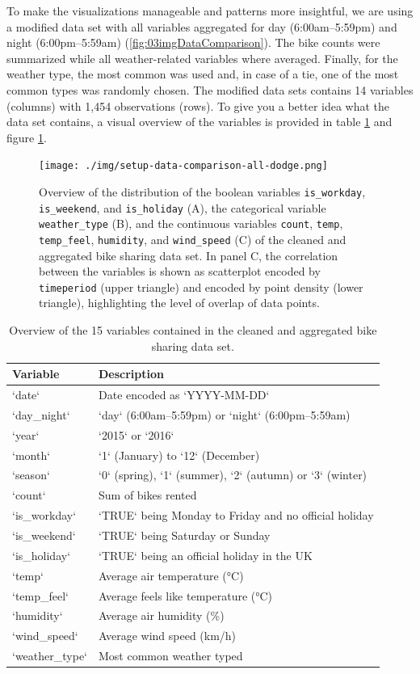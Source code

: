 \documentclass[
]{krantz}
\begin{document}
To make the visualizations manageable and patterns more insightful, we are using a modified data set with all variables aggregated for day (6:00am--5:59pm) and night (6:00pm--5:59am) (\ref{fig:03imgDataComparison}). The bike counts were summarized while all weather-related variables where averaged. Finally, for the weather type, the most common was used and, in case of a tie, one of the most common types was randomly chosen. The modified data sets contains 14 variables (columns) with 1,454 observations (rows). To give you a better idea what the data set contains, a visual overview of the variables is provided in table \ref{tab:03tableBikesData} and figure \ref{fig:03imgDataOverviewVars}.

\begin{figure}
\centering
\texttt{[image: ./img/setup-data-comparison-all-dodge.png]}
\caption{\label{fig:03imgDataOverviewVars}Overview of the distribution of the boolean variables \texttt{is\_workday}, \texttt{is\_weekend}, and \texttt{is\_holiday} (A), the categorical variable \texttt{weather\_type} (B), and the continuous variables \texttt{count}, \texttt{temp}, \texttt{temp\_feel}, \texttt{humidity}, and \texttt{wind\_speed} (C) of the cleaned and aggregated bike sharing data set. In panel C, the correlation between the variables is shown as scatterplot encoded by \texttt{timeperiod} (upper triangle) and encoded by point density (lower triangle), highlighting the level of overlap of data points.}
\end{figure}

\begin{longtable}[t]{ll}
\caption{\label{tab:03tableBikesData}Overview of the 15 variables contained in the cleaned and aggregated bike sharing data set.}\\
\toprule
Variable & Description\\
\midrule
`date` & Date encoded as `YYYY-MM-DD`\\
`day\_night` & `day` (6:00am–5:59pm) or `night` (6:00pm–5:59am)\\
`year` & `2015` or `2016`\\
`month` & `1` (January) to `12` (December)\\
`season` & `0` (spring), `1` (summer), `2` (autumn) or `3` (winter)\\
\addlinespace
`count` & Sum of bikes rented\\
`is\_workday` & `TRUE` being Monday to Friday and no official holiday\\
`is\_weekend` & `TRUE` being Saturday or Sunday\\
`is\_holiday` & `TRUE` being an official holiday in the UK\\
`temp` & Average air temperature (°C)\\
\addlinespace
`temp\_feel` & Average feels like temperature (°C)\\
`humidity` & Average air humidity (\%)\\
`wind\_speed` & Average wind speed (km/h)\\
`weather\_type` & Most common weather typed\\
\bottomrule
\end{longtable}
\end{document}
